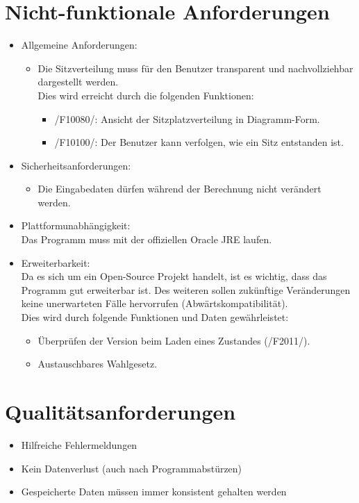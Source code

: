 \documentclass[10pt,a4paper]{article}
\begin{document}
\section{Nicht-funktionale Anforderungen}
\begin{itemize}
	\item Allgemeine Anforderungen:
	\begin{itemize}
		\item Die Sitzverteilung muss für den Benutzer transparent und nachvollziehbar dargestellt werden. \hfill \\
		Dies wird erreicht durch die folgenden Funktionen:
		\begin{itemize}
			\item /F10080/: Ansicht der Sitzplatzverteilung in Diagramm-Form.
			\item /F10100/: Der Benutzer kann verfolgen, wie ein Sitz entstanden ist.
		\end{itemize}
	\end{itemize}
	\item Sicherheitsanforderungen:
	\begin{itemize}
		\item Die Eingabedaten dürfen während der Berechnung nicht verändert werden.
	\end{itemize}
	\item Plattformunabhängigkeit: \hfill \\
	Das Programm muss mit der offiziellen Oracle JRE laufen.
	\item Erweiterbarkeit: \hfill \\
	Da es sich um ein Open-Source Projekt handelt, ist es wichtig, dass das Programm gut erweiterbar ist. Des weiteren sollen zukünftige Veränderungen keine unerwarteten Fälle hervorrufen (Abwärtskompatibilität). \\
	Dies wird durch folgende Funktionen und Daten gewährleistet:
	\begin{itemize}
		\item Überprüfen der Version beim Laden eines Zustandes (/F2011/).
		\item Austauschbares Wahlgesetz.
	\end{itemize}
\end{itemize}


\section{Qualitätsanforderungen}
\begin{itemize}
	\item Hilfreiche Fehlermeldungen
	\item Kein Datenverlust (auch nach Programmabstürzen)
	\item Gespeicherte Daten müssen immer konsistent gehalten werden
\end{itemize}
\newpage
\end{document}
